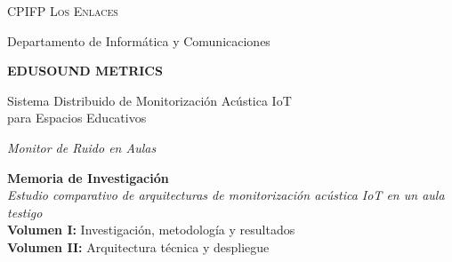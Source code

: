\documentclass[11pt,a4paper,openany]{report}
\begin{document}
\begin{titlepage}
    \pagecolor{CorpDark}
    \color{white}
    \centering
    \vspace*{1.5cm}

    {\Huge\textcolor{CorpAccent}{\faBroadcastTower}}\par
    \vspace{0.8cm}
    {\scshape\Large CPIFP Los Enlaces \par}
    \vspace{0.3cm}
    {\large Departamento de Inform\'atica y Comunicaciones\par}
    \vspace{2cm}

    {\Huge\bfseries EDUSOUND METRICS \par}
    \vspace{0.4cm}
    {\Large Sistema Distribuido de Monitorizaci\'on Ac\'ustica IoT \\ para Espacios Educativos \par}
    \vspace{0.6cm}
    {\large \textit{Monitor de Ruido en Aulas} \par}

    \vspace{2cm}
    \begin{tcolorbox}[
        colback=CorpDark!80!black,
        colframe=CorpBlue,
        coltext=white,
        width=0.88\textwidth,
        center, arc=8pt, boxrule=1.5pt, boxsep=10pt
    ]
        \centering
        \Large\textbf{Memoria de Investigaci\'on}\\[0.2cm]
        \normalsize
        \textit{Estudio comparativo de arquitecturas de monitorizaci\'on ac\'ustica IoT en un aula testigo}\\[0.4cm]
        \large
        \textcolor{CorpAccent}{\textbf{Volumen I:}} Investigaci\'on, metodolog\'ia y resultados\\[0.15cm]
        \textcolor{CorpAccent}{\textbf{Volumen II:}} Arquitectura t\'ecnica y despliegue
    \end{tcolorbox}


\end{titlepage}
\end{document}
